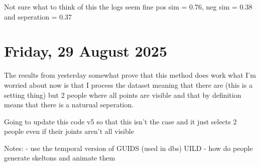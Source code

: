Not sure what to think of this the logs seem fine pos sim = 0.76, neg sim = 0.38 and seperation = 0.37
\section[2025/08/14]{Friday, 29 August 2025}
\label{sec:20250829}

The results from yesterday somewhat prove that this method does work what I'm worried about now is that I process the dataset
meaning that there are (this is a setting thing) but 2 people where all points are visible and that by definition means that there is a naturual 
seperation.

Going to update this code v5 so that this isn't the case and it just selects 2 people even if their joints aren't all visible




Notes:
- use the temporal version of GUIDS (used in dbs) UILD 
- how do people generate skeltons and animate them 